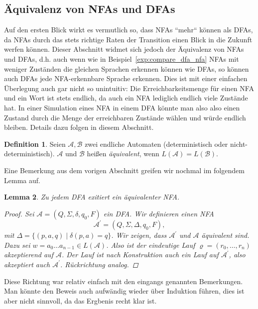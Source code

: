 \documentclass[11pt, a4paper]{article}
\theoremstyle{definition}
\newtheorem{definition}{Definition}[section]
\theoremstyle{plain}
\newtheorem{lemma}[definition]{Lemma}
\numberwithin{equation}{section}
\begin{document}
\subsection{Äquivalenz von NFAs und DFAs}\label{sec:regular_equivalence}
Auf den ersten Blick wirkt es vermutlich so, dass NFAs ``mehr`` können als DFAs, da NFAs durch das stets richtige Raten der Transition einen Blick in die Zukunft werfen können. Dieser Abschnitt widmet sich jedoch der Äquivalenz von NFAs und DFAs, d.h. auch wenn wie in Beispiel~\ref{exp:compare_dfa_nfa} NFAs mit weniger Zuständen die gleichen Sprachen erkennen können wie DFAs, so können auch DFAs jede NFA-erkennbare Sprache erkennen. Dies ist mit einer einfachen Überlegung auch gar nicht so unintuitiv: Die Erreichbarkeitsmenge für einen NFA und ein Wort ist stets endlich, da auch ein NFA lediglich endlich viele Zustände hat. In einer Simulation eines NFA in einem DFA könnte man also also einen Zustand durch die Menge der erreichbaren Zustände wählen und würde endlich bleiben. Details dazu folgen in diesem Abschnitt.
\begin{definition}\label{def:fa_equivalence}
	Seien $\mathcal{A}, \mathcal{B}$ zwei endliche Automaten (deterministisch oder nicht-de\-ter\-mi\-nis\-tisch). $\mathcal{A}$ und $\mathcal{B}$ heißen \textit{äquivalent}, wenn $L(\mathcal{A}) = L(\mathcal{B})$.
\end{definition}
Eine Bemerkung aus dem vorigen Abschnitt greifen wir nochmal im folgendem Lemma auf.
\begin{lemma}\label{lem:dfa2nfa}
	Zu jedem DFA exitiert ein äquivalenter NFA.
	\begin{proof}
		Sei $\mathcal{A} = (Q, \Sigma, \delta, q_0, F)$ ein DFA. Wir definieren einen NFA
		$$
			\mathcal{A}^\prime = (Q, \Sigma, \Delta, q_0, F),
		$$
		mit $\Delta = \{ (p, a, q) \mid \delta(p, a) = q \}$. Wir zeigen, dass $\mathcal{A}^\prime$ und $\mathcal{A}$ äquivalent sind. Dazu sei $w = a_0 \ldots a_{n-1} \in L(\mathcal{A})$. Also ist der eindeutige Lauf $\varrho = (r_0, \ldots, r_n)$ akzeptierend auf $\mathcal{A}$. Der Lauf ist nach Konstruktion auch ein Lauf auf $\mathcal{A}^\prime$, also akzeptiert auch $\mathcal{A}^\prime$. Rückrichtung analog.
	\end{proof}
\end{lemma}
Diese Richtung war relativ einfach mit den eingangs genannten Bemerkungen. Man könnte den Beweis auch aufwändig wieder über Induktion führen, dies ist aber nicht sinnvoll, da das Ergbenis recht klar ist.
\end{document}
